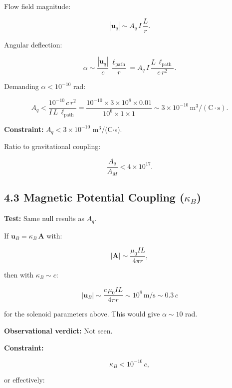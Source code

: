 \documentclass{article}
\begin{document}
Flow field magnitude:



\[
|\mathbf u_q| \sim A_q\,I\,\frac{L}{r}.
\]



Angular deflection:



\[
\alpha \sim \frac{|\mathbf u_q|}{c}\,\frac{\ell_{\text{path}}}{r}
= A_q\,I\,\frac{L\,\ell_{\text{path}}}{c\,r^2}.
\]



Demanding $\alpha < 10^{-10}$ rad:



\[
A_q < \frac{10^{-10}\,c\,r^2}{I\,L\,\ell_{\text{path}}}
= \frac{10^{-10} \times 3\times10^8 \times 0.01}{10^6 \times 1 \times 1}
\sim 3 \times 10^{-10}\,\text{m}^3/(\text{C}\cdot\text{s}).
\]



\textbf{Constraint:} $A_q < 3 \times 10^{-10}$ m$^3$/(C$\cdot$s).

Ratio to gravitational coupling:



\[
\frac{A_q}{A_M} < 4 \times 10^{17}.
\]



\subsection*{4.3 Magnetic Potential Coupling ($\kappa_B$)}

\textbf{Test:} Same null results as $A_q$.

If $\mathbf u_B = \kappa_B\,\mathbf A$ with:



\[
|\mathbf A| \sim \frac{\mu_0 I L}{4\pi r},
\]



then with $\kappa_B \sim c$:



\[
|\mathbf u_B| \sim \frac{c\,\mu_0 I L}{4\pi r}
\sim 10^8\,\text{m/s}
\sim 0.3\,c
\]



for the solenoid parameters above. This would give $\alpha \sim 10$ rad.

\textbf{Observational verdict:} Not seen.

\textbf{Constraint:}



\[
\kappa_B < 10^{-10}\,c,
\]



or effectively:
\end{document}
